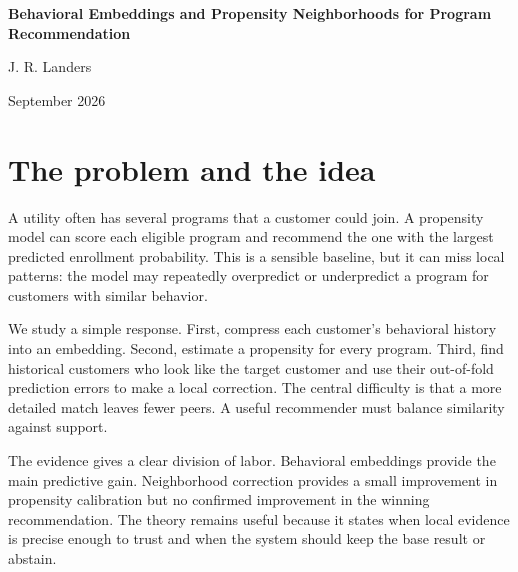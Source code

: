 \documentclass[10pt]{article}
\theoremstyle{noteplain}
\theoremstyle{definition}
\begin{document}
\begin{center}
  {\LARGE\bfseries Behavioral Embeddings and Propensity Neighborhoods for Program Recommendation\par}
  \vspace{0.55em}
  {\large J. R. Landers\,\par}
  \vspace{0.08em}
  {\small September 2026}
\end{center}

\section{The problem and the idea}

A utility often has several programs that a customer could join. A propensity model can score each eligible program and recommend the one with the largest predicted enrollment probability. This is a sensible baseline, but it can miss local patterns: the model may repeatedly overpredict or underpredict a program for customers with similar behavior.

We study a simple response. First, compress each customer's behavioral history into an embedding. Second, estimate a propensity for every program. Third, find historical customers who look like the target customer and use their out-of-fold prediction errors to make a local correction. The central difficulty is that a more detailed match leaves fewer peers. A useful recommender must balance similarity against support.

The evidence gives a clear division of labor. Behavioral embeddings provide the main predictive gain. Neighborhood correction provides a small improvement in propensity calibration but no confirmed improvement in the winning recommendation. The theory remains useful because it states when local evidence is precise enough to trust and when the system should keep the base result or abstain.
\end{document}
